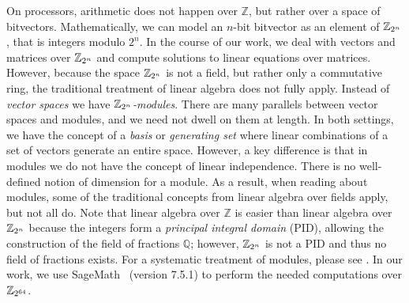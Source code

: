 On processors, arithmetic does not happen over $\mathbb{Z}$, but
rather over a space of bitvectors. Mathematically, we can model
an $n$-bit bitvector as an element of $\mathbb{Z}_{2^{n}}$, that is integers
modulo $2^n$. In the course of our work, we deal with vectors and
matrices over $\mathbb{Z}_{2^{n}}$ and compute solutions to linear equations over
matrices. However, because the space $\mathbb{Z}_{2^{n}}$ is not a field, but
rather only a commutative ring, the traditional treatment of linear
algebra does not fully apply. Instead of \emph{vector spaces} we
have \emph{$\mathbb{Z}_{2^{n}}$-modules}. There are many parallels between vector
spaces and modules, and we need not dwell on them at length. In both
settings, we have the concept of a \emph{basis} or \emph{generating
set} where linear combinations of a set of vectors generate an
entire space. However, a key difference is that in modules we do
not have the concept of linear independence. There is no
well-defined notion of dimension for a module. As a result, when
reading about modules, some of the traditional concepts from linear
algebra over fields apply, but not all do. Note that linear algebra
over $\mathbb{Z}$ is easier than linear algebra over $\mathbb{Z}_{2^{n}}$ because
the integers form a \emph{principal integral domain} (PID), allowing
the construction of the field of fractions $\mathbb{Q}$; however,
$\mathbb{Z}_{2^{n}}$ is not a PID and thus no field of fractions exists. For a
systematic treatment of modules, please see . In
our work, we use SageMath~\cite{sagemath} (version 7.5.1)
to perform the needed computations over $\mathbb{Z}_{2^{64}}$.

